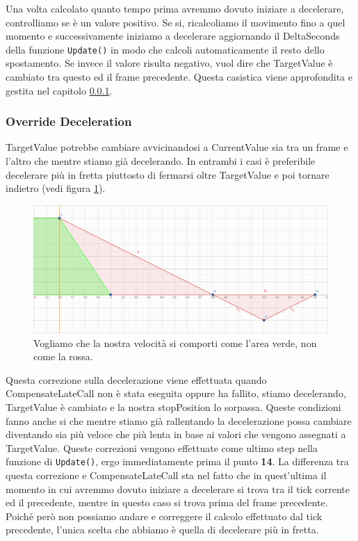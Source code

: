 \documentclass[main.tex]{subfiles}
\begin{document}
Una volta calcolato quanto tempo prima avremmo dovuto iniziare a decelerare, controlliamo se è un valore positivo. Se si, ricalcoliamo il movimento fino a quel momento e successivamente iniziamo a decelerare aggiornando il DeltaSeconds della funzione \lstinline{Update()} in modo che calcoli automaticamente il resto dello spostamento. \newline
Se invece il valore risulta negativo, vuol dire che TargetValue è cambiato tra questo ed il frame precedente. Questa casistica viene approfondita e gestita nel capitolo  \ref{subsubsec:4_2_OverrideDeceleration}.


\subsubsection{Override Deceleration}\label{subsubsec:4_2_OverrideDeceleration}
TargetValue potrebbe cambiare avvicinandosi a CurrentValue sia tra un frame e l'altro che mentre stiamo già decelerando. In entrambi i casi è preferibile decelerare più in fretta piuttosto di fermarsi oltre TargetValue e poi tornare indietro (vedi figura \ref{fig:4_OverrideDecelIntro}).
\begin{figure}[H]
    \centering
    \includegraphics[width=.95\linewidth]{img/interpolazione/OverrideDecelIntro.png}
    \caption{Vogliamo che la nostra velocità si comporti come l'area verde, non come la rossa.}
    \label{fig:4_OverrideDecelIntro}
\end{figure}
\noindent Questa correzione sulla decelerazione viene effettuata quando CompensateLateCall non è stata eseguita oppure ha fallito, stiamo decelerando, TargetValue è cambiato e la nostra stopPosition lo sorpassa. Queste condizioni fanno anche si che mentre stiamo già rallentando la decelerazione possa cambiare diventando sia più veloce che più lenta in base ai valori che vengono assegnati a TargetValue. Queste correzioni vengono effettuate come ultimo step nella funzione di \lstinline{Update()}, ergo immediatamente prima il punto \textbf{14}. \newline
La differenza tra questa correzione e CompensateLateCall sta nel fatto che in quest'ultima il momento in cui avremmo dovuto iniziare a decelerare si trova tra il tick corrente ed il precedente, mentre in questo caso si trova prima del frame precedente. Poiché però non possiamo andare  e correggere il calcolo effettuato dal tick precedente, l'unica scelta che abbiamo è quella di decelerare più in fretta.\newline
\end{document}
